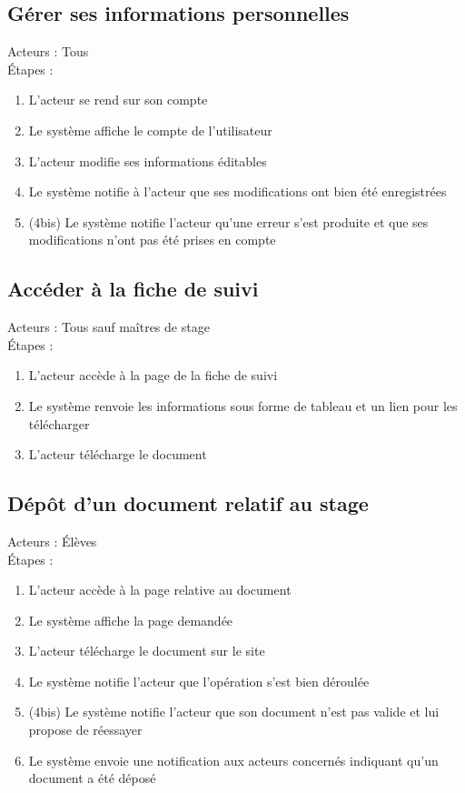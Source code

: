 \documentclass{scrreprt}
\begin{document}
\subsection{Gérer ses informations personnelles}
Acteurs : Tous 
\\
\'Etapes : 
\begin{enumerate}
\item L’acteur se rend sur son compte
\item Le syst\`eme affiche le compte de l’utilisateur 
\item L’acteur modifie ses informations \'editables
\item Le syst\`eme notifie \`a l’acteur que ses modifications ont bien \'et\'e enregistr\'ees
\item (4bis) Le système notifie l’acteur qu’une erreur s’est produite et que ses modifications n’ont pas été prises en compte
\end{enumerate}
\subsection{Acc\'eder \`a la fiche de suivi}
Acteurs : Tous sauf ma\^itres de stage
\\
\'Etapes : 
\begin{enumerate}
\item L’acteur acc\`ede \`a la page de la fiche de suivi
\item Le syst\`eme renvoie les informations sous forme de tableau et un lien pour les t\'el\'echarger
\item L’acteur t\'el\'echarge le document
\end{enumerate}
\subsection{D\'ep\^ot d'un document relatif au stage}
Acteurs : \'El\`eves 
\\
\'Etapes : 
\begin{enumerate}
\item L’acteur acc\`ede \`a la page relative au document
\item Le syst\`eme affiche la page demand\'ee
\item L’acteur t\'el\'echarge le document sur le site
\item Le syst\`eme notifie l’acteur que l’op\'eration s’est bien d\'eroul\'ee 
\item (4bis) Le syst\`eme notifie l’acteur que son document n’est pas valide et lui propose de r\'eessayer
\item Le syst\`eme envoie une notification aux acteurs concern\'es indiquant qu’un document a \'et\'e d\'epos\'e
\end{enumerate}
\end{document}
